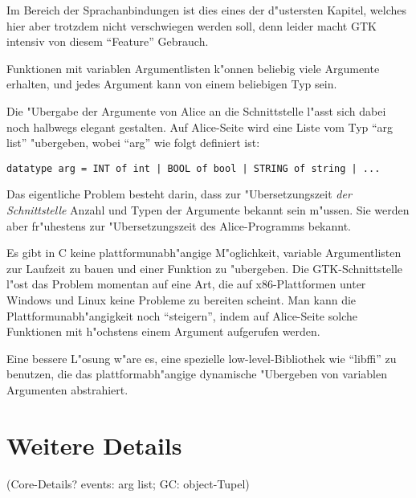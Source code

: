 \documentclass{article}
\begin{document}
Im Bereich der Sprachanbindungen ist dies eines der d"ustersten Kapitel,
welches hier aber trotzdem nicht verschwiegen werden soll, denn leider
macht GTK intensiv von diesem ``Feature'' Gebrauch.

Funktionen mit variablen Argumentlisten k"onnen beliebig viele Argumente
erhalten, und jedes Argument kann von einem beliebigen Typ sein.

Die "Ubergabe der Argumente von Alice an die Schnittstelle l"asst sich dabei
noch halbwegs elegant gestalten. Auf Alice-Seite wird eine Liste vom Typ
``arg list'' "ubergeben, wobei ``arg'' wie folgt definiert ist:

\begin{verbatim}
datatype arg = INT of int | BOOL of bool | STRING of string | ...
\end{verbatim}

Das eigentliche Problem besteht darin, dass zur "Ubersetzungszeit
\textit{der Schnittstelle} Anzahl und Typen der Argumente bekannt sein m"ussen.
Sie werden aber fr"uhestens zur "Ubersetzungszeit des
Alice-Programms bekannt.

Es gibt in C keine plattformunabh"angige M"oglichkeit,
variable Argumentlisten zur Laufzeit zu bauen und einer Funktion zu "ubergeben.
Die GTK-Schnittstelle l"ost das Problem momentan auf eine Art, die
auf x86-Plattformen unter Windows und Linux keine Probleme
zu bereiten scheint. Man kann die Plattformunabh"angigkeit noch ``steigern'',
indem auf Alice-Seite solche Funktionen mit h"ochstens einem Argument
aufgerufen werden.

Eine bessere L"osung w"are es, eine spezielle low-level-Bibliothek
wie ``libffi'' zu benutzen, die das plattformabh"angige dynamische "Ubergeben
von variablen Argumenten abstrahiert.

\section{Weitere Details}

(Core-Details? events: arg list; GC: object-Tupel)


\end{document}
